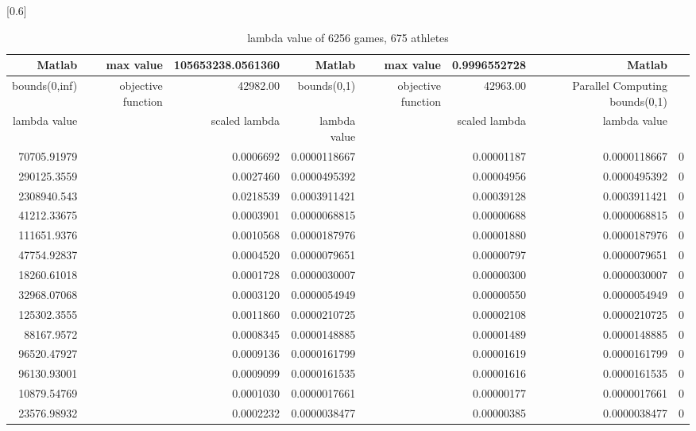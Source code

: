 \documentclass[
journal=jacsat, %
manuscript=article]{achemso}
\begin{document}
\begin{table}[htbp]
  \centering
  \caption{lambda value of 6256 games, 675 athletes}
  \scalebox{0.6}[0.6]{%
    \begin{tabular}{rrrrrrrr}
    \toprule
        Matlab & max value & 105653238.0561360 & Matlab & max value & 0.9996552728 & Matlab \\
    \hline
    bounds(0,inf) & objective function & 42982.00 & bounds(0,1) & objective function & 42963.00 &  Parallel Computing bounds(0,1) \\
    \hline
    lambda value &       & scaled lambda & lambda value  &       & scaled lambda & lambda value  \\
    \bottomrule
    70705.91979 &       & 0.0006692 & 0.0000118667 &       & 0.00001187 & 0.0000118667 & 0 \\
    290125.3559 &       & 0.0027460 & 0.0000495392 &       & 0.00004956 & 0.0000495392 & 0 \\
    2308940.543 &       & 0.0218539 & 0.0003911421 &       & 0.00039128 & 0.0003911421 & 0 \\
    41212.33675 &       & 0.0003901 & 0.0000068815 &       & 0.00000688 & 0.0000068815 & 0 \\
    111651.9376 &       & 0.0010568 & 0.0000187976 &       & 0.00001880 & 0.0000187976 & 0 \\
    47754.92837 &       & 0.0004520 & 0.0000079651 &       & 0.00000797 & 0.0000079651 & 0 \\
    18260.61018 &       & 0.0001728 & 0.0000030007 &       & 0.00000300 & 0.0000030007 & 0 \\
    32968.07068 &       & 0.0003120 & 0.0000054949 &       & 0.00000550 & 0.0000054949 & 0 \\
    125302.3555 &       & 0.0011860 & 0.0000210725 &       & 0.00002108 & 0.0000210725 & 0 \\
    88167.9572 &       & 0.0008345 & 0.0000148885 &       & 0.00001489 & 0.0000148885 & 0 \\
    96520.47927 &       & 0.0009136 & 0.0000161799 &       & 0.00001619 & 0.0000161799 & 0 \\
    96130.93001 &       & 0.0009099 & 0.0000161535 &       & 0.00001616 & 0.0000161535 & 0 \\
    10879.54769 &       & 0.0001030 & 0.0000017661 &       & 0.00000177 & 0.0000017661 & 0 \\
    23576.98932 &       & 0.0002232 & 0.0000038477 &       & 0.00000385 & 0.0000038477 & 0 \\

\end{tabular}}
\end{table}
\end{document}
